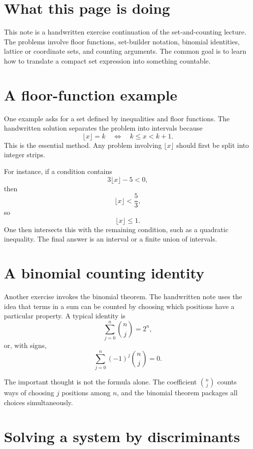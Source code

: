
\section{What this page is doing}

This note is a handwritten exercise continuation of the set-and-counting lecture.  The problems involve floor functions, set-builder notation, binomial identities, lattice or coordinate sets, and counting arguments.  The common goal is to learn how to translate a compact set expression into something countable.

\section{A floor-function example}

One example asks for a set defined by inequalities and floor functions.  The handwritten solution separates the problem into intervals because
\[
  \lfloor x\rfloor=k\quad\Longleftrightarrow\quad k\le x<k+1.
\]
This is the essential method.  Any problem involving \(\lfloor x\rfloor\) should first be split into integer strips.

For instance, if a condition contains
\[
  3\lfloor x\rfloor-5<0,
\]
then
\[
  \lfloor x\rfloor<\frac53,
\]
so
\[
  \lfloor x\rfloor\le1.
\]
One then intersects this with the remaining condition, such as a quadratic inequality.  The final answer is an interval or a finite union of intervals.

\section{A binomial counting identity}

Another exercise invokes the binomial theorem.  The handwritten note uses the idea that terms in a sum can be counted by choosing which positions have a particular property.  A typical identity is
\[
  \sum_{j=0}^n\binom nj=2^n,
\]
or, with signs,
\[
  \sum_{j=0}^n(-1)^j\binom nj=0.
\]

The important thought is not the formula alone.  The coefficient \(\binom nj\) counts ways of choosing \(j\) positions among \(n\), and the binomial theorem packages all choices simultaneously.

\section{Solving a system by discriminants}

